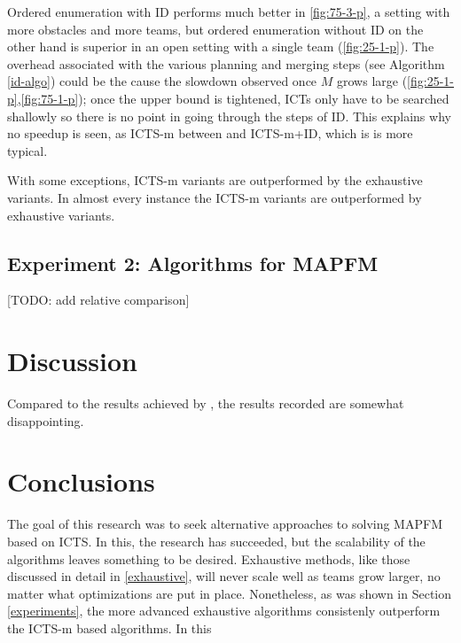 \documentclass[english,10pt]{article}
\begin{document}
	Ordered enumeration with ID performs much better in \ref{fig:75-3-p}, a setting with more obstacles and more teams, but ordered enumeration without ID on the other hand is superior in an open setting with a single team (\ref{fig:25-1-p}). The overhead associated with the various planning and merging steps (see Algorithm \ref{id-algo}) could be the cause the slowdown observed once $M$ grows large (\ref{fig:25-1-p},\ref{fig:75-1-p}); once the upper bound is tightened, ICTs only have to be searched shallowly so there is no point in going through the steps of ID. This explains why no speedup is seen, as ICTS-m between and ICTS-m+ID, which is is more typical.
	 
	
	With some exceptions, ICTS-m variants are outperformed by the exhaustive variants.
	In almost every instance the ICTS-m variants are outperformed by exhaustive variants. 
	\subsection{Experiment 2: Algorithms for MAPFM}
	[TODO: add relative comparison]

	\section{Discussion}
	
	
	Compared to the results achieved by \cite{ma2016}, the results recorded are somewhat disappointing.
	\section{Conclusions}
	The goal of this research was to seek alternative approaches to solving MAPFM based on ICTS. In this, the research has succeeded, but the scalability of the algorithms leaves something to be desired. Exhaustive methods, like those discussed in detail in \ref{exhaustive}, will never scale well as teams grow larger, no matter what optimizations are put in place. Nonetheless, as was shown in Section \ref{experiments}, the more advanced exhaustive algorithms consistenly outperform the ICTS-m based algorithms. In this
\end{document}
